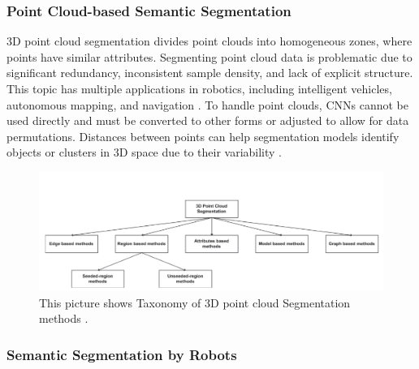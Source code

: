 \subsubsection{Point Cloud-based Semantic Segmentation}
3D point cloud segmentation divides point clouds into homogeneous zones, where points have similar attributes. Segmenting point cloud data is problematic due to significant redundancy, inconsistent sample density, and lack of explicit structure. This topic has multiple applications in robotics, including intelligent vehicles, autonomous mapping, and navigation \cite{nguyen20133d}. To handle point clouds, CNNs cannot be used directly and must be converted to other forms or adjusted to allow for data permutations.  Distances between points can help segmentation models identify objects or clusters in 3D space due to their variability \cite{wang2022comprehensive}. 

\begin{figure}[H]
  \centering
  \includegraphics[width= 1.0\textwidth]{Figures/Taxonomy of 3D point cloud Segmentation methods.PNG}
  \caption[Illustration of Taxonomy of 3D point cloud Segmentation methods ]{This picture shows Taxonomy of 3D point cloud Segmentation methods \cite{nguyen20133d}.}
  \label{fig:Taxonomy of 3D point cloud Segmentation methods}
\end{figure}
 
\subsubsection{Semantic Segmentation by Robots}

